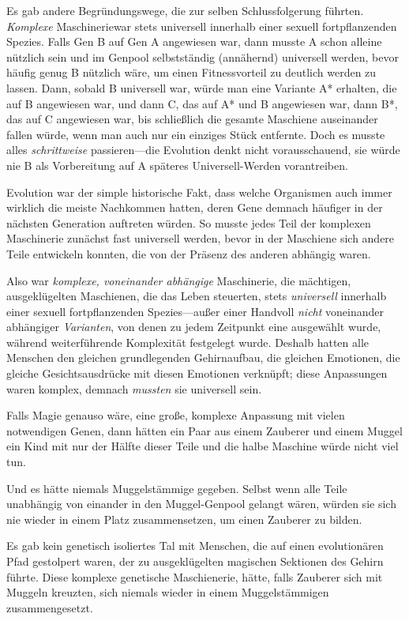 {Es gab andere Begründungswege, die zur selben Schlussfolgerung führten. \emph{Komplexe} Maschineriewar stets universell innerhalb einer sexuell fortpflanzenden Spezies. Falls Gen B auf Gen A angewiesen war, dann musste A schon alleine nützlich sein und im Genpool selbstständig (annähernd) universell werden, bevor häufig genug B nützlich wäre, um einen Fitnessvorteil zu deutlich werden zu lassen. Dann, sobald B universell war, würde man eine Variante A* erhalten, die auf B angewiesen war, und dann C, das auf A* und B angewiesen war, dann B*, das auf C angewiesen war, bis schließlich die gesamte Maschiene auseinander fallen würde, wenn man auch nur ein einziges Stück entfernte. Doch es musste alles \emph{schrittweise} passieren—die Evolution denkt nicht vorausschauend, sie würde nie B als Vorbereitung auf A späteres Universell-Werden vorantreiben.

Evolution war der simple historische Fakt, dass welche Organismen auch immer wirklich die meiste Nachkommen hatten, deren Gene demnach häufiger in der nächsten Generation auftreten würden. So musste jedes Teil der komplexen Maschinerie zunächst fast universell werden, bevor in der Maschiene sich andere Teile entwickeln konnten, die von der Präsenz des anderen abhängig waren.

Also war \emph{komplexe, voneinander abhängige} Maschinerie, die mächtigen, ausgeklügelten Maschienen, die das Leben steuerten, stets \emph{universell} innerhalb einer sexuell fortpflanzenden Spezies—außer einer Handvoll \emph{nicht} voneinander abhängiger \emph{Varianten}, von denen zu jedem Zeitpunkt eine ausgewählt wurde, während weiterführende Komplexität festgelegt wurde. Deshalb hatten alle Menschen den gleichen grundlegenden Gehirnaufbau, die gleichen Emotionen, die gleiche Gesichtsausdrücke mit diesen Emotionen verknüpft; diese Anpassungen waren komplex, demnach \emph{mussten} sie universell sein.

Falls Magie genauso wäre, eine große, komplexe Anpassung mit vielen notwendigen Genen, dann hätten ein Paar aus einem Zauberer und einem Muggel ein Kind mit nur der Hälfte dieser Teile und die halbe Maschine würde nicht viel tun.

Und es hätte niemals Muggelstämmige gegeben. Selbst wenn alle Teile unabhängig von einander in den Muggel-Genpool gelangt wären, würden sie sich nie wieder in einem Platz zusammensetzen, um einen Zauberer zu bilden.

Es gab kein genetisch isoliertes Tal mit Menschen, die auf einen evolutionären Pfad gestolpert waren, der zu ausgeklügelten magischen Sektionen des Gehirn führte. Diese komplexe genetische Maschienerie, hätte, falls Zauberer sich mit Muggeln kreuzten, sich niemals wieder in einem Muggelstämmigen zusammengesetzt.

}
